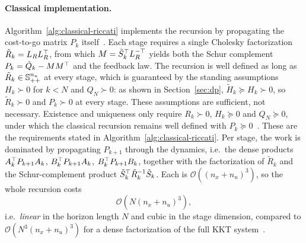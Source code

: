 \paragraph{Classical implementation.}
Algorithm~\ref{alg:classical-riccati} implements the recursion by propagating the
cost-to-go matrix $P_k$ itself~\cite{frison2013efficient}. Each stage requires a single Cholesky factorization
$\tilde{R}_k = L_R L_R^\top$, from which $M = \tilde{S}_k^\top L_R^{-\top}$ yields both the
Schur complement $P_k = \tilde{Q}_k - M M^\top$ and the feedback law.
The recursion is well defined as long as $\tilde{R}_k \in \mathbb{S}_{++}^{n_u}$ at every
stage, which is guaranteed by the standing assumptions
$H_k \succ 0$ for $k < N$ and $Q_N \succ 0$: as shown in Section~\ref{sec:dp},
$\tilde{H}_k \succeq H_k \succ 0$, so $\tilde{R}_k \succ 0$ and $P_k \succ 0$ at
every stage.
These assumptions are sufficient, not necessary. Existence and uniqueness only
require $R_k\succ0$, $H_k\succeq0$ and $Q_N\succeq0$, under which the classical
recursion remains well defined with $P_k\succeq0$~\cite{frison2015algorithms}. These are the requirements
stated in Algorithm~\ref{alg:classical-riccati}.
Per stage, the work is dominated by propagating $P_{k+1}$ through the dynamics,
i.e.\ the dense products $A_k^\top P_{k+1} A_k$, $B_k^\top P_{k+1} A_k$, $B_k^\top P_{k+1} B_k$,
together with the factorization of $\tilde{R}_k$ and the Schur-complement
product $\tilde{S}_k^\top \tilde{R}_k^{-1} \tilde{S}_k$. Each is
$\mathcal{O}\!\left((n_x + n_u)^3\right)$, so the whole recursion costs
\[
\mathcal{O}\!\left(N (n_x + n_u)^3\right),
\]
i.e.\ \textit{linear} in the horizon length $N$ and cubic in the stage
dimension, compared to $\mathcal{O}\!\left(N^3 (n_x + n_u)^3\right)$ for a dense
factorization of the full KKT system~\cite{frison2013efficient}.

